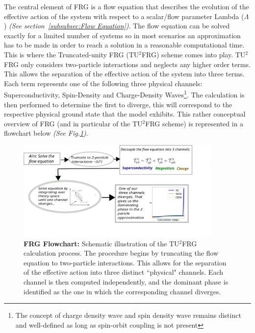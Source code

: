 \documentclass[11pt]{article}
\begin{document}
\noindent  The central element of FRG is a flow equation that describes the evolution of the effective action of the system with respect to a scalar/flow parameter Lambda ($\Lambda$) \textit{(See section~\ref{subsubsec:Flow Equation})}.
The flow equation can be solved exactly for a limited number of systems so in most scenarios an approximation has to be made in order to reach a solution in a reasonable computational time.  
This is where the Truncated-unity FRG (TU$^2$FRG) scheme comes into play. TU$^2$FRG only considers two-particle
interactions and neglects any higher order terms.
This allows the separation of the effective action of the system into three terms. Each term represents one of the following three physical channels: Superconductivity, Spin-Density and Charge-Density Waves\footnote{The concept of charge density wave and spin density wave remains distinct and well-defined as long as spin-orbit coupling is not present}.
The calculation is then performed to determine the first to diverge, this will correspond to the respective physical ground state that the model exhibits. This rather conceptual overview of FRG (and in particular of the TU$^2$FRG scheme) is represented in a flowchart below \textit{(See Fig.\ref{fig:FRGflowdiagram})}.
 

\begin{figure}[htbp]  %
    \centering
    \includegraphics[width=0.9\textwidth]{FRGflowdiagram.png}  %
    \caption{\textbf{FRG Flowchart:} Schematic illustration of the TU$^2$FRG calculation process.
     The procedure begins by truncating the flow equation to two-particle interactions. 
     This allows for the separation of the effective action into three distinct ``physical" channels. 
     Each channel is then computed independently, and the dominant phase is identified as the 
     one in which the corresponding channel diverges.}
    \label{fig:FRGflowdiagram}
\end{figure}
\end{document}
